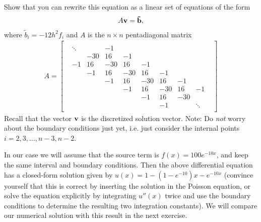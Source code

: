 \documentclass[11pt,a4wide]{article}
\begin{document}
\begin{itemize}
Show that you can rewrite this equation as a linear set of equations of the form
\begin{align}
A{\bf v} = {\bf \tilde{b}},
\end{align}
where $\tilde{b}_i = -12h^2 f_i$ and $A$ is the $n\times n$ pentadiagonal matrix 
  \begin{align}
A = \begin{bmatrix}  &        &        &         &       &      &       &       &       &       \\ 
                            & \ddots &        &    -1   &       &      &       &       &       &       \\ 
                            &        &  -30   &    16   &   -1  &      &       &       &       &       \\ 
                            &    -1  &   16   &   -30   &   16  &  -1  &       &       &       &       \\ 
                            &        &   -1   &    16   &  -30  &  16  &   -1  &       &       &       \\ 
                            &        &        &    -1   &   16  & -30  &   16  &   -1  &       &       \\ 
                            &        &        &         &   -1  &  16  &  -30  &   16  &  -1   &       \\ 
                            &        &        &         &       &  -1  &   16  &  -30  &       &       \\ 
                            &        &        &         &       &      &   -1  &       & \ddots&       \\ 
                            &        &        &         &       &      &       &       &       &       
\end{bmatrix}
  \end{align}
Recall that the vector ${\bf v}$ is the discretized solution vector. Note: Do \emph{not} worry about the boundary conditions just yet, i.e. just consider the internal points $i=2,3,\dots,n-3,n-2$.

In our case we will assume that the source term is $f(x) = 100e^{−10x}$, and keep the same interval and boundary conditions. Then the above differential equation has a closed-form solution given by $u(x) = 1−(1−e^{−10})x−e^{−10x}$ (convince yourself that this is correct by inserting the solution in the Poisson equation, or solve the equation explicitly by integrating $u''(x)$ twice and use the boundary conditions to determine the resulting two integration constants). We will compare our numerical solution with this result in the next exercise.
\end{itemize}
\end{document}
